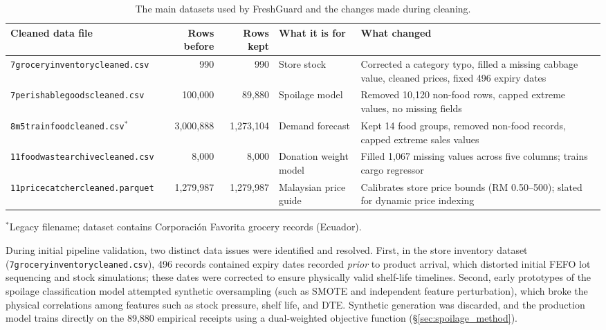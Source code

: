 \documentclass[12pt,a4paper]{article}
\renewcommand{\_}{\oldunderscore\allowbreak}
\begin{document}
\begin{table}[H]
\centering
\caption{The main datasets used by FreshGuard and the changes made during cleaning.}
\label{tab:datasets}
\renewcommand{\arraystretch}{1.15}
{\scriptsize
\begin{tabularx}{\textwidth}{@{} l r r l >{\raggedright\arraybackslash}X @{}}
\toprule
\rowcolor{NavyPrimary}
\color{white}\textbf{Cleaned data file} & \color{white}\textbf{Rows before} & \color{white}\textbf{Rows kept} & \color{white}\textbf{What it is for} & \color{white}\textbf{What changed} \\
\midrule
\texttt{7\_grocery\_inventory\_cleaned.csv} & 990 & 990 & Store stock & Corrected a category typo, filled a missing cabbage value, cleaned prices, fixed 496 expiry dates \\
\rowcolor{LightBg}
\texttt{7\_perishable\_goods\_cleaned.csv} & 100,000 & 89,880 & Spoilage model & Removed 10,120 non-food rows, capped extreme values, no missing fields \\
\texttt{8\_m5\_train\_food\_cleaned.csv}$^*$ & 3,000,888 & 1,273,104 & Demand forecast & Kept 14 food groups, removed non-food records, capped extreme sales values \\
\rowcolor{LightBg}
\texttt{11\_food\_waste\_archive\_cleaned.csv} & 8,000 & 8,000 & Donation weight model & Filled 1,067 missing values across five columns; trains cargo regressor \\
\texttt{11\_pricecatcher\_cleaned.parquet} & 1,279,987 & 1,279,987 & Malaysian price guide~\cite{dosm2026} & Calibrates store price bounds (RM 0.50--500); slated for dynamic price indexing \\
\bottomrule
\end{tabularx}}
\begin{flushleft}
\scriptsize $^*$Legacy filename; dataset contains Corporación Favorita grocery records (Ecuador).
\end{flushleft}
\end{table}

\begin{keyfinding}
During initial pipeline validation, two distinct data issues were identified and resolved. First, in the store inventory dataset (\texttt{7\_grocery\_inventory\_cleaned.csv}), 496 records contained expiry dates recorded \emph{prior} to product arrival, which distorted initial FEFO lot sequencing and stock simulations; these dates were corrected to ensure physically valid shelf-life timelines. Second, early prototypes of the spoilage classification model attempted synthetic oversampling (such as SMOTE and independent feature perturbation), which broke the physical correlations among features such as stock pressure, shelf life, and DTE. Synthetic generation was discarded, and the production model trains directly on the 89,880 empirical receipts using a dual-weighted objective function (§\ref{sec:spoilage_method}).
\end{keyfinding}
\end{document}
